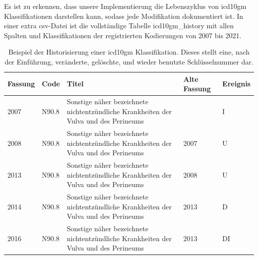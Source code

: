 Es ist zu erkennen, dass unsere Implementierung die Lebenszyklus von \ac{icd10gm} Klassifikationen darstellen kann, sodass jede Modifikation dokumentiert ist. In einer extra \ac{csv}-Datei ist die vollständige Tabelle \textsf{icd10gm\_history} mit allen Spalten und Klassifikationen der registrierten Kodierungen von 2007 bis 2021.

\begin{table}[ht]
	\centering
	\small
	\caption[Beispiel der Historisierung einer \acs{icd10gm} Klassifikation]{Beispiel der Historisierung einer \acs{icd10gm} Klassifikation. Dieses stellt eine, nach der Einführung, veränderte, gelöschte, und wieder benutzte Schlüsselnummer dar.}
	\label{tab:IUDDI}
	\begin{tabular}{|l|l|p{6cm}|l|l|}
		\hline
		\rowcolor{lightgray} Fassung & Code & Titel & Alte Fassung & Ereignis \\ \hline
			2007 & N90.8  & Sonstige näher bezeichnete nichtentzündliche Krankheiten der Vulva und des Perineums &  & I \\ \hline
			2008 & N90.8  & Sonstige näher bezeichnete nichtentzündliche Krankheiten der Vulva und des Perineums & 2007 & U \\ \hline
			2013 & N90.8  & Sonstige näher bezeichnete nichtentzündliche Krankheiten der Vulva und des Perineums & 2008 & U \\ \hline
			2014 & N90.8  & Sonstige näher bezeichnete nichtentzündliche Krankheiten der Vulva und des Perineums & 2013 & D \\ \hline
			2016 & N90.8  & Sonstige näher bezeichnete nichtentzündliche Krankheiten der Vulva und des Perineums & 2013 & DI \\ \hline
	\end{tabular}
\end{table}

